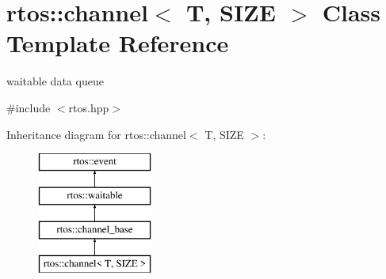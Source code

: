\hypertarget{classrtos_1_1channel}{}\section{rtos\+:\+:channel$<$ T, S\+I\+ZE $>$ Class Template Reference}
\label{classrtos_1_1channel}


waitable data queue  




{\ttfamily \#include $<$rtos.\+hpp$>$}

Inheritance diagram for rtos\+:\+:channel$<$ T, S\+I\+ZE $>$\+:\begin{figure}[H]
\begin{center}
\leavevmode
\includegraphics[height=4.000000cm]{classrtos_1_1channel}
\end{center}
\end{figure}
